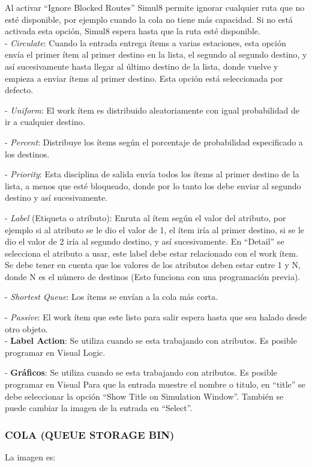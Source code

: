 \documentclass[runningheads]{llncs}
\begin{document}
 Al activar “Ignore Blocked Routes” Simul8 permite ignorar cualquier ruta que no esté disponible, por ejemplo cuando la cola no tiene más capacidad. Si no está activada esta opción, Simul8 espera hasta que la ruta esté disponible. \\
 
 - \textit{Circulate}: Cuando la entrada entrega ítems a varias estaciones, esta opción envía el primer ítem al primer destino en la lista, el segundo al segundo destino, y así sucesivamente hasta llegar al último destino de la lista, donde vuelve y empieza a enviar ítems al primer destino. Esta opción está seleccionada por defecto.
 
 - \textit{Uniform}: El work ítem es distribuido aleatoriamente con igual probabilidad de ir a cualquier destino.
 
 - \textit{Percent}: Distribuye los ítems según el porcentaje de probabilidad especificado a los destinos.
 
 - \textit{Priority}: Esta disciplina de salida envía todos los ítems al primer destino de la lista, a menos que esté bloqueado, donde por lo tanto los debe enviar al segundo destino y así sucesivamente.
 
 - \textit{Label} (Etiqueta o atributo): Enruta al ítem según el valor del atributo, por ejemplo si al atributo se le dio el valor de 1, el ítem iría al primer destino, si se le dio el valor de 2 iría al segundo destino, y así sucesivamente.  En “Detail” se selecciona el atributo a usar, este label debe estar relacionado con el work ítem. Se debe tener en cuenta que los valores de los atributos deben estar entre 1 y N, donde N es el número de destinos (Esto funciona con una programación previa).
 
 - \textit{Shortest Queue}: Los ítems se envían a la cola más corta.
 
 - \textit{Passive}: El work ítem que este listo para salir espera hasta que sea halado desde otro objeto. \\
 
 - \textbf{Label Action}: Se utiliza cuando se esta trabajando con atributos. Es posible programar en Visual Logic. 
 
 - \textbf{Gráficos}: Se utiliza cuando se esta trabajando con atributos. Es posible programar en Visual Para que la entrada muestre el nombre o titulo, en “title” se debe seleccionar la opción “Show Title on Simulation Window”. También se puede cambiar la imagen de la entrada en “Select”. 

\subsubsection{COLA (QUEUE STORAGE BIN)} La imagen es: 
\end{document}

